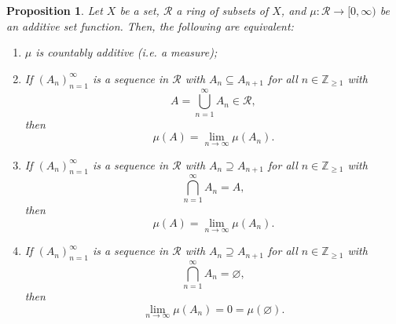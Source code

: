 \documentclass[a4paper, openany]{memoir}
\theoremstyle{definition}
\theoremstyle{plain}
\newtheorem{proposition}[definition]{Proposition}
\begin{document}
    \begin{proposition}
        Let $X$ be a set, $\mathcal{R}$ a ring of subsets of $X$, and $\mu \colon \mathcal{R} \to [0, \infty)$ be an additive set function. Then, the following are equivalent:
        \begin{enumerate}
            \item $\mu$ is countably additive (i.e. a measure);
            \item If $(A_n)_{n=1}^\infty$ is a sequence in $\mathcal{R}$ with $A_n \subseteq A_{n+1}$ for all $n \in \mathbb{Z}_{\geq 1}$ with
            \[A = \bigcup_{n=1}^\infty A_n \in \mathcal{R},\]
            then
            \[\mu(A) = \lim_{n \to \infty} \mu(A_n).\]
            \item If $(A_n)_{n=1}^\infty$ is a sequence in $\mathcal{R}$ with $A_n \supseteq A_{n+1}$ for all $n \in \mathbb{Z}_{\geq 1}$ with
            \[\bigcap_{n=1}^\infty A_n = A,\]
            then
            \[\mu(A) = \lim_{n \to \infty} \mu(A_n).\]
            \item If $(A_n)_{n=1}^\infty$ is a sequence in $\mathcal{R}$ with $A_n \supseteq A_{n+1}$ for all $n \in \mathbb{Z}_{\geq 1}$ with
            \[\bigcap_{n=1}^\infty A_n = \varnothing,\]
            then
            \[\lim_{n \to \infty} \mu(A_n) = 0 = \mu(\varnothing).\]
        \end{enumerate}
    \end{proposition}
\end{document}
